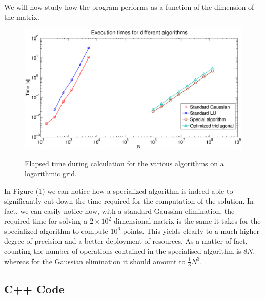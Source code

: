 \documentclass {article}
\begin{document}
We will now study how the program performs as a function of the dimension of the matrix. 

\begin{figure}[ht]
 \centering
   {\includegraphics[width=18cm]{times.eps}}
 \caption{Elapsed time during calculation for the various algorithms on a logarithmic grid.}
\end{figure}

In Figure (1) we can notice how a specialized algorithm is indeed able to significantly cut down the time required for the computation of the solution.
In fact, we can easily notice how, with a standard Gaussian elimination, the required time for solving a $2 \times 10^2$  dimensional matrix is the same it takes for the specialized algorithm to compute $10^6$ points. This yields clearly to a much higher degree of precision and a better deployment of resources.
As a matter of fact, counting the number of operations contained in the specialised algorithm is $8N$, whereas for the Gaussian elimination it should amount to $\frac{1}{3} N^3$. 


\newpage
\subsection{C++ Code}
\end{document}
